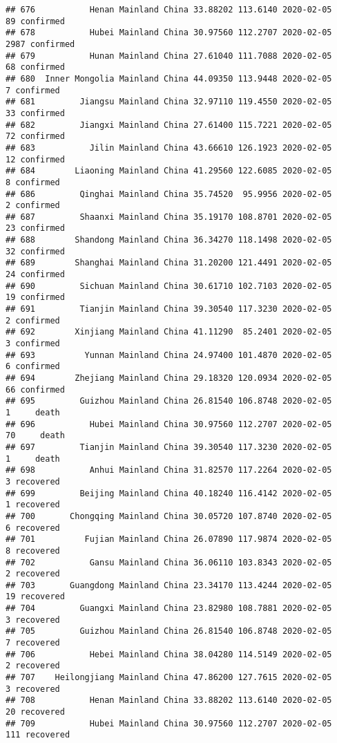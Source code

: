 \documentclass[
]{article}
\begin{document}
\begin{verbatim}
## 676           Henan Mainland China 33.88202 113.6140 2020-02-05    89 confirmed
## 678           Hubei Mainland China 30.97560 112.2707 2020-02-05  2987 confirmed
## 679           Hunan Mainland China 27.61040 111.7088 2020-02-05    68 confirmed
## 680  Inner Mongolia Mainland China 44.09350 113.9448 2020-02-05     7 confirmed
## 681         Jiangsu Mainland China 32.97110 119.4550 2020-02-05    33 confirmed
## 682         Jiangxi Mainland China 27.61400 115.7221 2020-02-05    72 confirmed
## 683           Jilin Mainland China 43.66610 126.1923 2020-02-05    12 confirmed
## 684        Liaoning Mainland China 41.29560 122.6085 2020-02-05     8 confirmed
## 686         Qinghai Mainland China 35.74520  95.9956 2020-02-05     2 confirmed
## 687         Shaanxi Mainland China 35.19170 108.8701 2020-02-05    23 confirmed
## 688        Shandong Mainland China 36.34270 118.1498 2020-02-05    32 confirmed
## 689        Shanghai Mainland China 31.20200 121.4491 2020-02-05    24 confirmed
## 690         Sichuan Mainland China 30.61710 102.7103 2020-02-05    19 confirmed
## 691         Tianjin Mainland China 39.30540 117.3230 2020-02-05     2 confirmed
## 692        Xinjiang Mainland China 41.11290  85.2401 2020-02-05     3 confirmed
## 693          Yunnan Mainland China 24.97400 101.4870 2020-02-05     6 confirmed
## 694        Zhejiang Mainland China 29.18320 120.0934 2020-02-05    66 confirmed
## 695         Guizhou Mainland China 26.81540 106.8748 2020-02-05     1     death
## 696           Hubei Mainland China 30.97560 112.2707 2020-02-05    70     death
## 697         Tianjin Mainland China 39.30540 117.3230 2020-02-05     1     death
## 698           Anhui Mainland China 31.82570 117.2264 2020-02-05     3 recovered
## 699         Beijing Mainland China 40.18240 116.4142 2020-02-05     1 recovered
## 700       Chongqing Mainland China 30.05720 107.8740 2020-02-05     6 recovered
## 701          Fujian Mainland China 26.07890 117.9874 2020-02-05     8 recovered
## 702           Gansu Mainland China 36.06110 103.8343 2020-02-05     2 recovered
## 703       Guangdong Mainland China 23.34170 113.4244 2020-02-05    19 recovered
## 704         Guangxi Mainland China 23.82980 108.7881 2020-02-05     3 recovered
## 705         Guizhou Mainland China 26.81540 106.8748 2020-02-05     7 recovered
## 706           Hebei Mainland China 38.04280 114.5149 2020-02-05     2 recovered
## 707    Heilongjiang Mainland China 47.86200 127.7615 2020-02-05     3 recovered
## 708           Henan Mainland China 33.88202 113.6140 2020-02-05    20 recovered
## 709           Hubei Mainland China 30.97560 112.2707 2020-02-05   111 recovered

\end{verbatim}
\end{document}
